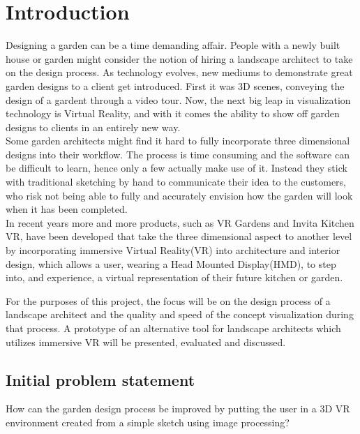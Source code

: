\chapter{Introduction}
	Designing a garden can be a time demanding affair. People with a newly built house or garden might consider the notion of hiring a landscape architect to take on the design process. As technology evolves, new mediums to demonstrate great garden designs to a client get introduced\cite{landscapeArchitectureDigiTech}. First it was 3D scenes, conveying the design of a gardent through a video tour. Now, the next big leap in visualization technology is Virtual Reality\cite{VRS}, and with it comes the ability to show off garden designs to clients in an entirely new way.\\
	
	Some garden architects might find it hard to fully incorporate three dimensional designs into their workflow. The process is time consuming and the software can be difficult to learn, hence only a few actually make use of it. Instead they stick with traditional sketching by hand to communicate their idea to the customers, who risk not being able to fully and accurately envision how the garden will look when it has been completed.\\
	
	In recent years more and more products, such as VR Gardens and Invita Kitchen VR, have been developed that take the three dimensional aspect to another level by incorporating immersive Virtual Reality(VR) into architecture and interior design, which allows a user, wearing a Head Mounted Display(HMD), to step into, and experience, a virtual representation of their future kitchen or garden.
	
	For the purposes of this project, the focus will be on the design process of a landscape architect and the quality and speed of the concept visualization during that process. A prototype of an alternative tool for landscape architects which utilizes immersive VR will be presented, evaluated and discussed.
	
	
	\section{Initial problem statement}
	How can the garden design process be improved by putting the user in a 3D VR environment created from a simple sketch using image processing?
	